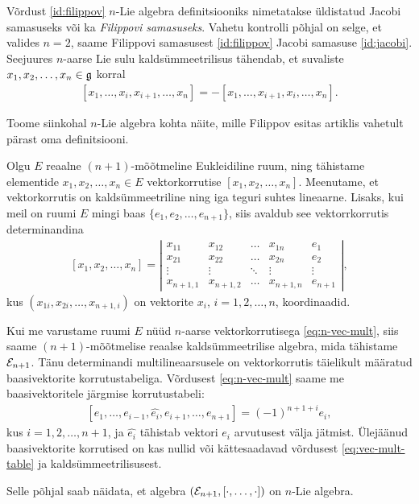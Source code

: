 Võrdust \eqref{id:filippov} $n$-Lie algebra definitsiooniks
nimetatakse üldistatud Jacobi samasuseks või ka
\emph{Filippovi samasuseks}. Vahetu kontrolli põhjal
on selge, et valides $n = 2$, saame Filippovi samasusest
\eqref{id:filippov} Jacobi samasuse \eqref{id:jacobi}. Seejuures
$n$-aarse Lie sulu kaldsümmeetrilisus tähendab, et
suvaliste $x_1, x_2, \dots, x_n \in \mathfrak{g}$ korral
\begin{align}\label{def:n-lie-brac-antisymm}
    [x_1, \dots, x_i, x_{i+1}, \dots, x_n] =
    -[x_1, \dots, x_{i+1}, x_i, \dots, x_n].
\end{align}

Toome siinkohal $n$-Lie algebra kohta näite, mille
Filippov esitas artiklis \cite{filippov1985} vahetult
pärast oma definitsiooni.

\begin{naide}
    Olgu $E$ reaalne $(n+1)$-mõõtmeline Eukleidiline ruum,
    ning tähistame elementide $x_1, x_2, \dots, x_n \in E$
    vektorkorrutise $[x_1, x_2, \dots, x_n]$. Meenutame, 
    et vektorkorrutis on kaldsümmeetriline ning iga teguri
    suhtes lineaarne. Lisaks, kui meil on ruumi $E$ mingi
    baas $\{e_1, e_2, \dots, e_{n+1}\}$, siis avaldub see
    vektorrkorrutis determinandina
    \begin{align}\label{eq:n-vec-mult}
        [x_1, x_2, \dots, x_n] = \left|\begin{matrix}
          x_{11}    & x_{12}    & \dots  & x_{1n}    & e_1    \\
          x_{21}    & x_{22}    & \dots  & x_{2n}    & e_2    \\
          \vdots    & \vdots    & \ddots & \vdots    & \vdots \\
          x_{n+1,1} & x_{n+1,2} & \dots  & x_{n+1,n} & e_{n+1}
        \end{matrix}\right|,
    \end{align}
    kus $(x_{1i}, x_{2i}, \dots, x_{n+1,i})$ on vektorite
    $x_i$, $i = 1, 2, \dots, n$, koordinaadid.

    Kui me varustame ruumi $E$ nüüd $n$-aarse vektorkorrutisega
    \eqref{eq:n-vec-mult}, siis saame $(n+1)$-mõõtmelise
    reaalse kaldsümmeetrilise algebra, mida tähistame
    $\mathcal{E}_{n+1}$. Tänu determinandi multilineaarsusele on
    vektorkorrutis täielikult määratud baasivektorite
    korrutustabeliga. Võrdusest \eqref{eq:n-vec-mult} saame
    me baasivektoritele järgmise korrutustabeli:
    \begin{align}\label{eq:vec-mult-table}
        [e_1, \dots, e_{i-1}, \hat{e_i}, e_{i+1}, \dots, e_{n+1}]
        = (-1)^{n+1+i} e_i,
    \end{align}
    kus $i = 1, 2, \dots, n+1$, ja $\hat{e_i}$ tähistab
    vektori $e_i$ arvutusest välja jätmist. Ülejäänud
    baasivektorite korrutised on kas nullid või kättesaadavad
    võrdusest \eqref{eq:vec-mult-table} ja
    kaldsümmeetrilisusest.

    Selle põhjal saab näidata, et algebra
    $(\mathcal{E}_{n+1}, [\cdot, \dots, \cdot])$ on $n$-Lie
    algebra.\cite{filippov1985}
\end{naide}

